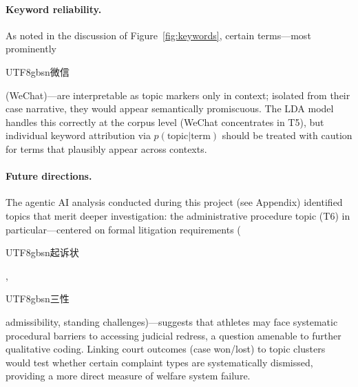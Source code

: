 \documentclass[10pt,letterpaper]{article}
\begin{document}
\paragraph{Keyword reliability.}
As noted in the discussion of Figure~\ref{fig:keywords}, certain terms---most prominently \begin{CJK}{UTF8}{gbsn}微信\end{CJK} (WeChat)---are interpretable as topic markers only in context; isolated from their case narrative, they would appear semantically promiscuous. The LDA model handles this correctly at the corpus level (WeChat concentrates in T5), but individual keyword attribution via $p(\text{topic} | \text{term})$ should be treated with caution for terms that plausibly appear across contexts.

\paragraph{Future directions.}
The agentic AI analysis conducted during this project (see Appendix) identified topics that merit deeper investigation: the administrative procedure topic (T6) in particular---centered on formal litigation requirements (\begin{CJK}{UTF8}{gbsn}起诉状\end{CJK}, \begin{CJK}{UTF8}{gbsn}三性\end{CJK} admissibility, standing challenges)---suggests that athletes may face systematic procedural barriers to accessing judicial redress, a question amenable to further qualitative coding. Linking court outcomes (case won/lost) to topic clusters would test whether certain complaint types are systematically dismissed, providing a more direct measure of welfare system failure.
\end{document}
